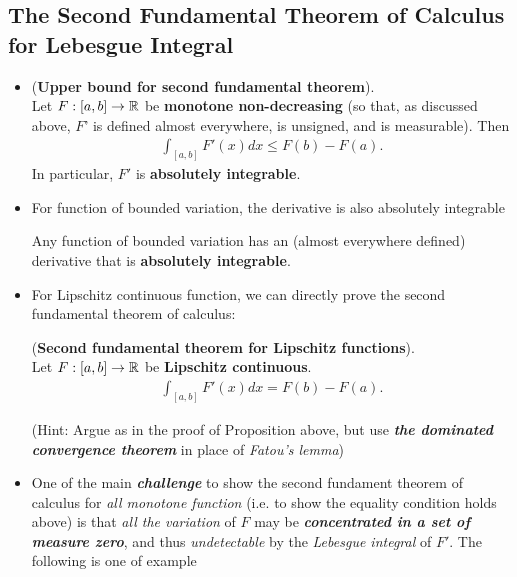 \documentclass[11pt]{article}
\begin{document}
\subsection{The Second Fundamental Theorem of Calculus for Lebesgue Integral}
\begin{itemize}
\item \begin{proposition} (\textbf{Upper bound for second fundamental theorem}). \\
Let $F: [a, b] \rightarrow {\mathbb R}$ be \textbf{monotone non-decreasing} (so that, as discussed above, $F$' is defined almost everywhere, is unsigned, and is
measurable). Then
\begin{align*}
\int_{[a, b]}F'(x) dx \le F(b) - F(a).
\end{align*} In particular, $F'$ is \textbf{absolutely integrable}.
\end{proposition}

\item For function of bounded variation, the derivative is also absolutely integrable
\begin{proposition}
Any function of bounded variation has an (almost everywhere defined) derivative that is \textbf{absolutely integrable}.
\end{proposition}

\item For Lipschitz continuous function, we can directly prove the second fundamental theorem of calculus:
\begin{theorem} (\textbf{Second fundamental theorem for Lipschitz functions}). \\
Let $F: [a, b] \rightarrow {\mathbb R}$ be \textbf{Lipschitz continuous}.\begin{align*}
\int_{[a, b]}F'(x) dx = F(b) - F(a).
\end{align*}
\end{theorem} (Hint: Argue as in the proof of Proposition above, but use \emph{\textbf{the dominated convergence theorem}}  in place of
\emph{Fatou’s lemma})

\item \begin{remark}
One of the main \emph{\textbf{challenge}} to show the second fundament theorem of calculus for \emph{all monotone function} (i.e. to show the equality condition  holds above) is that \emph{all the variation} of $F$ may be \textbf{\emph{concentrated in a set of measure zero}}, and thus \emph{undetectable} by the \emph{Lebesgue integral} of $F'$. The following is one of example
\end{remark}


\end{itemize}
\end{document}
